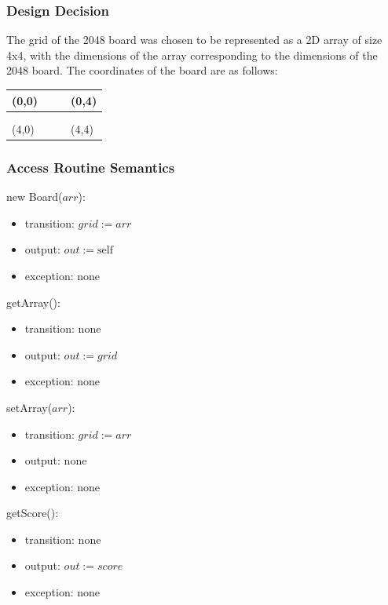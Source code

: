 \documentclass[12pt]{article}
\begin{document}
\subsubsection*{Design Decision}

The grid of the 2048 board was chosen to be represented as a 2D array of size 4x4, with the dimensions of the array corresponding to the dimensions of the 2048 board. The coordinates of the board are as follows:
\begin{table}[h]
\centering
\begin{tabular}{|l|l|l|l|}
\hline
(0,0) &  &  & (0,4) \\ \hline
      &  &  &       \\ \hline
      &  &  &       \\ \hline
(4,0) &  &  & (4,4) \\ \hline
\end{tabular}
\end{table}

\subsubsection* {Access Routine Semantics}

\noindent new Board($\mathit{arr}$):
\begin{itemize}
\item transition: $\mathit{grid} := \mathit{arr}$
\item output: $out := \mbox{self}$
\item exception: none
\end{itemize}

\noindent getArray():
\begin{itemize}
\item transition: none
\item output: $\mathit{out} := \mathit{grid}$
\item exception: none
\end{itemize}

\noindent setArray($\mathit{arr}$):
\begin{itemize}
\item transition: $\mathit{grid} := \mathit{arr}$
\item output: none
\item exception: none
\end{itemize}

\noindent getScore():
\begin{itemize}
\item transition: none
\item output: $\mathit{out} := \mathit{score}$
\item exception: none
\end{itemize}
\end{document}
